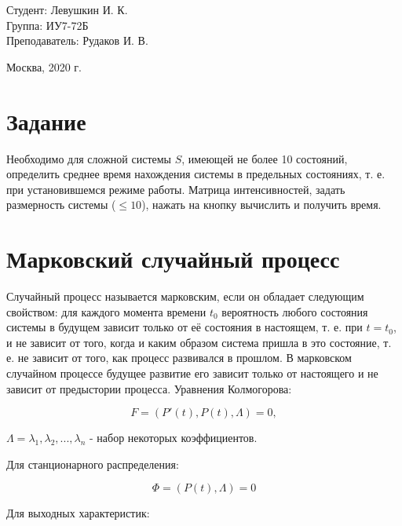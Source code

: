\documentclass[a4paper,12pt]{article}
\begin{document}
	\large
	\begin{flushright}
		Студент: Левушкин И. К. \\
		Группа: ИУ7-72Б \\
		Преподаватель: Рудаков И. В. \\
	\end{flushright}
	
	\vspace*{25mm}
	\begin{center}
		Москва, 2020 г.  
	\end{center}
	\thispagestyle{empty}
	
	
	\newpage
	
	\section*{Задание}
	
	Необходимо для сложной системы $S$, имеющей не более 10 состояний, определить среднее время нахождения системы в предельных состояниях, т. е. при установившемся режиме работы. Матрица интенсивностей, задать размерность системы ($\leqslant 10$), нажать на кнопку вычислить и получить время.
	
	\section*{Марковский случайный процесс}
	
	Случайный процесс называется марковским, если он обладает следующим свойством: для каждого момента времени $t_0$ вероятность любого состояния системы в будущем зависит только от её состояния в настоящем, т. е. при $t = t_0$, и не зависит от того, когда и каким образом система пришла в это состояние, т. е. не зависит от того, как процесс развивался в прошлом. В марковском случайном процессе будущее развитие его зависит только от настоящего и не зависит от предыстории процесса. Уравнения Колмогорова:
	
	\begin{equation}
	F = (P'(t), P(t), \Lambda) = 0,
	\end{equation}
	
	$\Lambda = \lambda_1, \lambda_2, ..., \lambda_n$ - набор некоторых коэффициентов.
	
	
	Для станционарного распределения:
	
	\begin{equation}
	\Phi = (P(t), \Lambda) = 0
	\end{equation}
	
	Для выходных характеристик:
	
\end{document}
